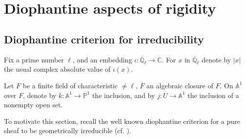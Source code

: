 \chapter{Diophantine aspects of rigidity}
\label{chap:7}
\setcounter{section}{-1}

\section{Diophantine criterion for irreducibility}
\label{sec:7.0}

Fix a prime number \(\ell\), and an embedding \(\iota:\overline{\mathbb{Q}}_\ell\to\mathbb{C}\). For \(x\) in \(\overline{\mathbb{Q}}_\ell\) denote by \(|x|\) the usual complex absolute value of \(\iota(x)\).

Let \(F\) be a finite field of characteristic \(\ne\ell\), \(\overline{F}\) an algebraic closure of \(F\). On \(\mathbb{A}^1\) over \(F\), denote by \(k:\mathbb{A}^1\to\mathbb{P}^1\) the inclusion, and by \(j:U\to\mathbb{A}^1\) the inclusion of a nonempty open set.

To motivate this section, recall the well known diophantine criterion for a pure sheaf to be geometrically irreducible (cf. \cite[sections II and III]{Ka-MFC}).

